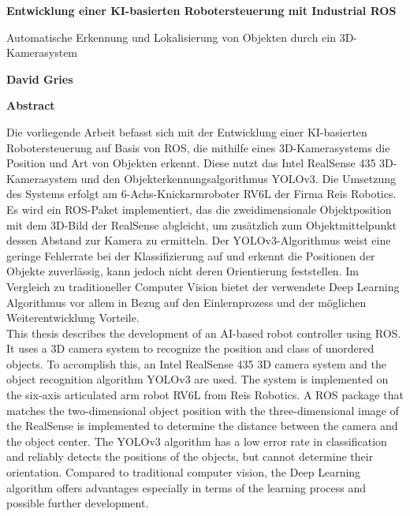 \newpage
\begin{center}
    \Large
    \textbf{Entwicklung einer KI-basierten Robotersteuerung mit Industrial ROS}
       
    \large
    Automatische Erkennung und Lokalisierung von Objekten durch ein 3D-Kamerasystem
        
    \vspace{0.4cm}
    \textbf{David Gries}
       
    \vspace{2cm}
    \textbf{Abstract}
\end{center}

Die vorliegende Arbeit befasst sich mit der Entwicklung einer KI-basierten Robotersteuerung auf Basis von ROS, die mithilfe eines 3D-Kamerasystems die Position und Art von Objekten erkennt. Diese nutzt das Intel RealSense 435 3D-Kamerasystem und den Objekterkennungsalgorithmus YOLOv3. Die Umsetzung des Systems erfolgt am 6-Achs-Knickarmroboter RV6L der Firma Reis Robotics. Es wird ein ROS-Paket implementiert, das die zweidimensionale Objektposition mit dem 3D-Bild der RealSense abgleicht, um zusätzlich zum Objektmittelpunkt dessen Abstand zur Kamera zu ermitteln. Der YOLOv3-Algorithmus weist eine geringe Fehlerrate bei der Klassifizierung auf und erkennt die Positionen der Objekte zuverlässig, kann jedoch nicht deren Orientierung feststellen. Im Vergleich zu traditioneller Computer Vision bietet der verwendete Deep Learning Algorithmus vor allem in Bezug auf den Einlernprozess und der möglichen Weiterentwicklung Vorteile.\\

This thesis describes the development of an AI-based robot controller using ROS. It uses a 3D camera system to recognize the position and class of unordered objects. To accomplish this, an Intel RealSense 435 3D camera system and the object recognition algorithm YOLOv3 are used. The system is implemented on the six-axis articulated arm robot RV6L from Reis Robotics. A ROS package that matches the two-dimensional object position with the three-dimensional image of the RealSense is implemented to determine the distance between the camera and the object center. The YOLOv3 algorithm has a low error rate in classification and reliably detects the positions of the objects, but cannot determine their orientation. Compared to traditional computer vision, the Deep Learning algorithm offers advantages especially in terms of the learning process and possible further development.